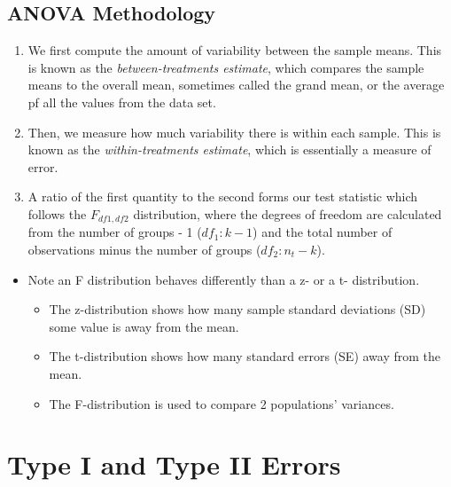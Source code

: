 \documentclass[
  letterpaper,
  DIV=11,
  numbers=noendperiod]{scrreprt}
\providecommand{\tightlist}{%
  \setlength{\itemsep}{0pt}\setlength{\parskip}{0pt}}\usepackage{longtable,booktabs,array}
\begin{document}
\section{ANOVA Methodology}\label{anova-methodology}

\begin{enumerate}
\def\labelenumi{\arabic{enumi}.}
\tightlist
\item
  We first compute the amount of variability between the sample means.
  This is known as the \emph{between-treatments estimate}, which
  compares the sample means to the overall mean, sometimes called the
  grand mean, or the average pf all the values from the data set.
\item
  Then, we measure how much variability there is within each sample.
  This is known as the \emph{within-treatments estimate}, which is
  essentially a measure of error.
\item
  A ratio of the first quantity to the second forms our test statistic
  which follows the \(F_{df1,df2}\) distribution, where the degrees of
  freedom are calculated from the number of groups - 1 (\(df_1: k-1\))
  and the total number of observations minus the number of groups
  (\(df_2: n_t-k\)).
\end{enumerate}

\begin{itemize}
\tightlist
\item
  Note an F distribution behaves differently than a z- or a t-
  distribution.

  \begin{itemize}
  \tightlist
  \item
    The z-distribution shows how many sample standard deviations (SD)
    some value is away from the mean.
  \item
    The t-distribution shows how many standard errors (SE) away from the
    mean.
  \item
    The F-distribution is used to compare 2 populations' variances.
  \end{itemize}
\end{itemize}


\chapter{Type I and Type II Errors}\label{type-i-and-type-ii-errors}
\end{document}
